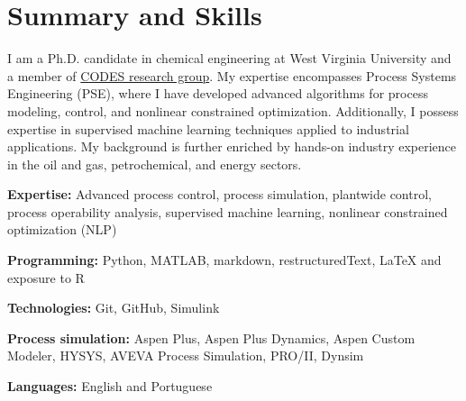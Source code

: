 \documentclass[letterpaper,12pt]{article}
\newcommand{\resumeSubHeadingListStart}{\begin{itemize}[leftmargin=0.15in, label={}]}
\newcommand{\resumeSubHeadingListEnd}{\end{itemize}}
\begin{document}
\section{Summary and Skills}
  \vspace{2pt}
  I am a Ph.D. candidate in chemical engineering at West Virginia University and a member of \href{https://fernandolima.faculty.wvu.edu/}{\color{blue}CODES research group}. My expertise encompasses Process Systems Engineering (PSE), where I have developed advanced algorithms for process modeling, control, and nonlinear constrained optimization. Additionally, I possess expertise in supervised machine learning techniques applied to industrial applications. My background is further enriched by hands-on industry experience in the oil and gas, petrochemical, and energy sectors.
  \resumeSubHeadingListStart
    \small{\item{

        \textbf{Expertise:}{ Advanced process control, process simulation, plantwide control, process operability analysis, supervised machine learning, nonlinear constrained optimization (NLP)} \\ \vspace{3pt}

        \textbf{Programming:}{ Python, MATLAB, markdown, restructuredText, LaTeX and exposure to R} \\ \vspace{3pt}
        
        \textbf{Technologies:}{ Git, GitHub, Simulink} \\ \vspace{3pt}

        \textbf{Process simulation:}{ Aspen Plus, Aspen Plus Dynamics, Aspen Custom Modeler, HYSYS, AVEVA Process Simulation, PRO/II, Dynsim} \\ \vspace{3pt}

        \textbf{Languages:}{ English and Portuguese}
        
    }}
  \resumeSubHeadingListEnd
\end{document}
